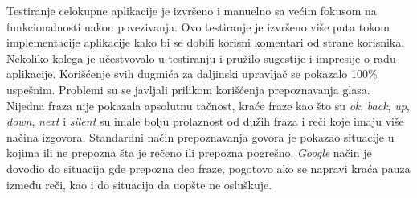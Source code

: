 \documentclass[../TamaraIvanovicMasterRad.tex]{subfiles}
\begin{document}
Testiranje celokupne aplikacije je izvršeno i manuelno sa većim fokusom na funkcionalnosti nakon povezivanja. Ovo testiranje je izvršeno više puta tokom implementacije aplikacije kako bi se dobili korisni komentari od strane korisnika. Nekoliko kolega je učestvovalo u testiranju i pružilo sugestije i impresije o radu aplikacije. Korišćenje svih dugmića za daljinski upravljač se pokazalo 100\% uspešnim. Problemi su se javljali prilikom korišćenja prepoznavanja glasa. Nijedna fraza nije pokazala apsolutnu tačnost, kraće fraze kao što su \textit{ok}, \textit{back}, \textit{up}, \textit{down}, \textit{next} i \textit{silent} su imale bolju prolaznost od dužih fraza i reči koje imaju više načina izgovora. Standardni način prepoznavanja govora je pokazao situacije u kojima ili ne prepozna šta je rečeno ili prepozna pogrešno. \textit{Google} način je dovodio do situacija gde prepozna deo fraze, pogotovo ako se napravi kraća pauza između reči, kao i do situacija da uopšte ne osluškuje. 
\end{document}
